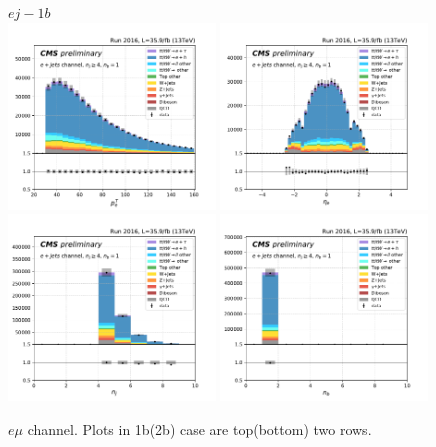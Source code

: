 \begin{figure}[ht]
    \centering
    $e j- 1b$ \\
    \includegraphics[width=0.49\textwidth]{chapters/Appendix/sectionPlots/figures/kinematics_pickles/e4j/1b/e4j_1b_lepton1_pt.pdf}
    \includegraphics[width=0.49\textwidth]{chapters/Appendix/sectionPlots/figures/kinematics_pickles/e4j/1b/e4j_1b_lepton1_eta.pdf}
    \includegraphics[width=0.49\textwidth]{chapters/Appendix/sectionPlots/figures/kinematics_pickles/e4j/1b/e4j_1b_nJets.pdf}
    \includegraphics[width=0.49\textwidth]{chapters/Appendix/sectionPlots/figures/kinematics_pickles/e4j/1b/e4j_1b_nBJets.pdf}
    
    \caption{$e\mu$ channel. Plots in 1b(2b) case are top(bottom) two rows.}
\end{figure}

